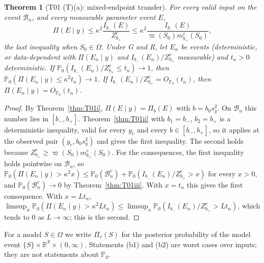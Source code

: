 \documentclass[11pt]{article}
\newtheorem{theorem}{Theorem}[section]
\theoremstyle{remark}
\newcommand{\R}{\mathbb R}
\newcommand{\Prob}{\mathbb P}
\newcommand{\vp}{\varpi}
\newcommand{\Om}{\Omega}
\newcommand{\B}{\mathcal B}
\newcommand{\sy}{s_y}
\newcommand{\yc}{y_c}
\newcommand{\bm}{b_-}
\newcommand{\bp}{b_+}
\begin{document}
\begin{theorem}[T01 (T)(a): mixed-endpoint transfer]\label{thm:Ta}
For every valid input on the event $\B_n$, and every measurable parameter event $E$,
\[
\Pi(E\mid y)\le\kappa^2\frac{I_{\bm}(E)}{Z^c_{\bp}}\le\kappa^2\frac{I_{\bm}(E)}{\vp(S_0)m^c_{\bp}(S_0)},
\]
the last inequality when $S_0\in\Om$. Under G and R, let $E_n$ be events (deterministic, or data-dependent with $\Pi(E_n\mid y)$ and $I_{\bm}(E_n)/Z^c_{\bp}$ measurable) and $t_n>0$ deterministic. If $\Prob_0(I_{\bm}(E_n)/Z^c_{\bp}\le t_n)\to1$, then $\Prob_0(\Pi(E_n\mid y)\le\kappa^2t_n)\to1$. If $I_{\bm}(E_n)/Z^c_{\bp}=O_{\Prob_0}(t_n)$, then $\Pi(E_n\mid y)=O_{\Prob_0}(t_n)$.
\end{theorem}
\begin{proof}
By Theorem~\ref{thm:T01i}, $\Pi(E\mid y)=\Pi_{b}(E)$ with $b=b_0\sy^2$. On $\B_n$ this number lies in $[\bm,\bp]$. Theorem~\ref{thm:T01ii} with $b_1=\bm$, $b_2=\bp$ is a deterministic inequality, valid for every $\yc$ and every $b\in[\bm,\bp]$, so it applies at the observed pair $(\yc,b_0\sy^2)$ and gives the first inequality. The second holds because $Z^c_{\bp}\ge\vp(S_0)m^c_{\bp}(S_0)$. For the consequences,
the first inequality holds pointwise on $\B_n$, so $\Prob_0(\Pi(E_n\mid y)>\kappa^2 x)\le\Prob_0(\B_n^c)+\Prob_0(I_{\bm}(E_n)/Z^c_{\bp}>x)$ for every $x>0$, and $\Prob_0(\B_n^c)\to0$ by Theorem~\ref{thm:T01iii}. With $x=t_n$ this gives the first consequence. With $x=Lt_n$, $\limsup_n\Prob_0(\Pi(E_n\mid y)>\kappa^2Lt_n)\le\limsup_n\Prob_0(I_{\bm}(E_n)/Z^c_{\bp}>Lt_n)$, which tends to $0$ as $L\to\infty$; this is the second.
\end{proof}

For a model $S\in\Om$ we write $\Pi_r(S)$ for the posterior probability of the model event $\{S\}\times\R^S\times(0,\infty)$. Statements (b1) and (b2) are worst cases over inputs; they are not statements about $\Prob_0$.
\end{document}
